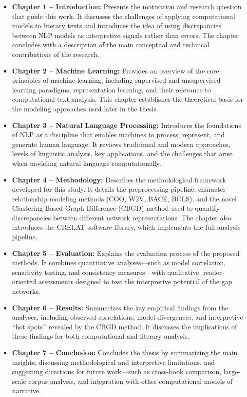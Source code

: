 \documentclass[a4paper,12pt]{report}
\begin{document}
\begin{itemize}
    \item \textbf{Chapter 1 – Introduction:} Presents the motivation and research question that guide this work. It discusses the challenges of applying computational models to literary texts and introduces the idea of using discrepancies between NLP models as interpretive signals rather than errors. The chapter concludes with a description of the main conceptual and technical contributions of the research.
    
    \item \textbf{Chapter 2 – Machine Learning:} Provides an overview of the core principles of machine learning, including supervised and unsupervised learning paradigms, representation learning, and their relevance to computational text analysis. This chapter establishes the theoretical basis for the modeling approaches used later in the thesis.
    
    \item \textbf{Chapter 3 – Natural Language Processing:} Introduces the foundations of NLP as a discipline that enables machines to process, represent, and generate human language. It reviews traditional and modern approaches, levels of linguistic analysis, key applications, and the challenges that arise when modeling natural language computationally.
    
    \item \textbf{Chapter 4 – Methodology:} Describes the methodological framework developed for this study. It details the preprocessing pipeline, character relationship modeling methods (COO, W2V, BACE, BCLS), and the novel Clustering-Based Graph Difference (CBGD) method used to quantify discrepancies between different network representations. The chapter also introduces the CRELAT software library, which implements the full analysis pipeline.
    
    \item \textbf{Chapter 5 – Evaluation:} Explains the evaluation process of the proposed methods. It combines quantitative analyses—such as model correlation, sensitivity testing, and consistency measures—with qualitative, reader-oriented assessments designed to test the interpretive potential of the gap networks.
    
    \item \textbf{Chapter 6 – Results:} Summarizes the key empirical findings from the analyses, including observed correlations, model divergences, and interpretive “hot spots” revealed by the CBGD method. It discusses the implications of these findings for both computational and literary analysis.
    
    \item \textbf{Chapter 7 – Conclusion:} Concludes the thesis by summarizing the main insights, discussing methodological and interpretive limitations, and suggesting directions for future work—such as cross-book comparison, large-scale corpus analysis, and integration with other computational models of narrative.
\end{itemize}
\end{document}
